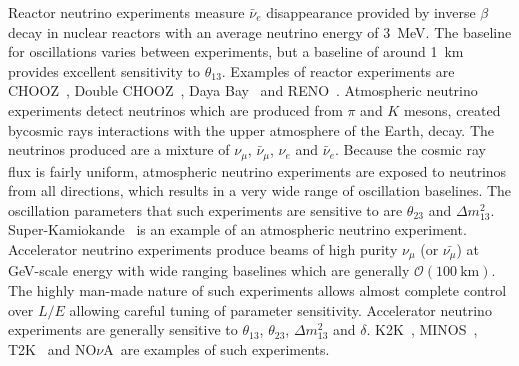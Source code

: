 \newline
\newline
Reactor neutrino experiments measure $\bar{\nu}_e$ disappearance provided by inverse $\beta$ decay in nuclear reactors with an average neutrino energy of 3~MeV.  The baseline for oscillations varies between experiments, but a baseline of around 1~km provides excellent sensitivity to $\theta_{13}$. Examples of reactor experiments are CHOOZ~\cite{CHOOZ}, Double CHOOZ~\cite{Abe201366}, Daya Bay~\cite{PhysRevLett.108.171803} and RENO~\cite{PhysRevLett.108.191802}.
\newline
\newline
Atmospheric neutrino experiments detect neutrinos which are produced from $\pi$ and $K$ mesons, created bycosmic rays interactions with the upper atmosphere of the Earth, decay.  The neutrinos produced are a mixture of $\nu_\mu$, $\bar{\nu}_\mu$, $\nu_e$ and $\bar{\nu}_e$.  Because the cosmic ray flux is fairly uniform, atmospheric neutrino experiments are exposed to neutrinos from all directions, which results in a very wide range of oscillation baselines.  The oscillation parameters that such experiments are sensitive to are $\theta_23$ and $\Delta m^2_{13}$. Super-Kamiokande~\cite{PhysRevLett.81.1562} is an example of an atmospheric neutrino experiment. 
\newline
\newline
Accelerator neutrino experiments produce beams of high purity $\nu_\mu$ (or $\bar{\nu_\mu}$) at GeV-scale energy with wide ranging baselines which are generally $\mathcal{O}\left(100~\textrm{km}\right)$.  The highly man-made nature of such experiments allows almost complete control over $L/E$ allowing careful tuning of parameter sensitivity.  Accelerator neutrino experiments are generally sensitive to $\theta_{13}$, $\theta_{23}$, $\Delta m^{2}_{13}$ and $\delta$. K2K~\cite{PhysRevD.74.072003}, MINOS~\cite{PhysRevLett.97.191801}, T2K~\cite{PhysRevLett.112.061802} and NO$\nu$A~\cite{Ayres:2004js}are examples of such experiments.
